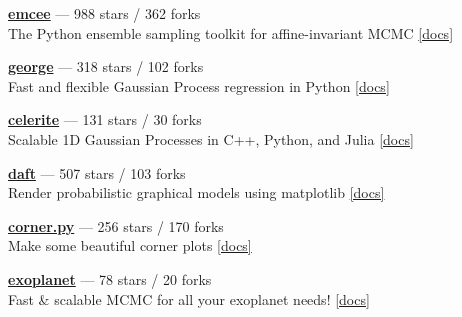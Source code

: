 \item \href{https://github.com/dfm/emcee}{{\bf emcee}} --- 988 stars / 362 forks \\
The Python ensemble sampling toolkit for affine-invariant MCMC \href{https://emcee.readthedocs.io}{[docs]}

\item \href{https://github.com/dfm/george}{{\bf george}} --- 318 stars / 102 forks \\
Fast and flexible Gaussian Process regression in Python \href{http://george.readthedocs.io}{[docs]}

\item \href{https://github.com/dfm/celerite}{{\bf celerite}} --- 131 stars / 30 forks \\
Scalable 1D Gaussian Processes in C++, Python, and Julia \href{http://celerite.rtfd.io}{[docs]}

\item \href{https://github.com/daft-dev/daft}{{\bf daft}} --- 507 stars / 103 forks \\
Render probabilistic graphical models using matplotlib \href{https://docs.daft-pgm.org}{[docs]}

\item \href{https://github.com/dfm/corner.py}{{\bf corner.py}} --- 256 stars / 170 forks \\
Make some beautiful corner plots \href{http://corner.readthedocs.io}{[docs]}

\item \href{https://github.com/dfm/exoplanet}{{\bf exoplanet}} --- 78 stars / 20 forks \\
Fast {\&} scalable MCMC for all your exoplanet needs!  \href{https://exoplanet.dfm.io}{[docs]}